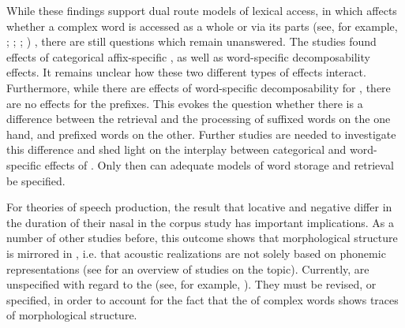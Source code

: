 While these findings support dual route models of lexical access, in which  affects whether a complex word is accessed as a whole or via its parts (see, for example, \citealt{Frauenfelder.1992}; \citealt{Schreuder.2015}; \citealt{deVaan.2011}; \citealt{Caselli.2016})
, there are still questions which remain unanswered. The studies found effects of categorical affix-specific , as well as word-specific decomposability effects. It remains unclear how these two different types of  effects interact. Furthermore, while there are effects of word-specific decomposability for , there are no effects for the prefixes. This evokes the question whether there is a difference between the retrieval and the processing of suffixed words on the one hand, and prefixed words on the other. Further studies are needed to investigate this difference and shed light on the interplay between categorical and word-specific effects of . Only then can adequate {models of word storage and retrieval} be specified. 



For theories of speech production, the result that locative  and negative  differ in the duration of their nasal in the corpus study has important implications. 
As a number of other studies before, this outcome shows that morphological structure is mirrored in , i.e. that  acoustic realizations are not solely based on phonemic representations (see  for an overview of studies on the topic). Currently,  are unspecified with regard to the  (see, for example, \citealt{Dell.1986,Johnson.1997b,Levelt.1999b,Bybee.2002,Pierrehumbert.2001,Pierrehumbert.2002}). They must be revised, or specified, in order to account for the fact that the  of complex words shows traces of morphological structure.

